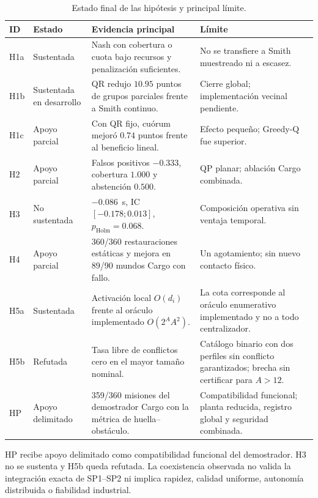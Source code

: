 \begin{table}[H]
  \centering
  \caption{Estado final de las hipótesis y principal límite.}
  \label{tab:conclusion-hypotheses}
  \small
  \setlength{\tabcolsep}{3pt}
  \begin{tabularx}{\textwidth}{@{}p{0.8cm}p{1.75cm}p{5.1cm}X@{}}
    \toprule
    ID & Estado & Evidencia principal & Límite \\
    \midrule
    H1a & Sustentada & Nash con cobertura o cuota bajo recursos y penalización suficientes. & No se transfiere a Smith muestreado ni a escasez. \\
    H1b & Sustentada en desarrollo & QR redujo $10.95$ puntos de grupos parciales frente a Smith continuo. & Cierre global; implementación vecinal pendiente. \\
    H1c & Apoyo parcial & Con QR fijo, cuórum mejoró $0.74$ puntos frente al beneficio lineal. & Efecto pequeño; Greedy-Q fue superior. \\
    H2 & Apoyo parcial & Falsos positivos $-0.333$, cobertura $1.000$ y abstención $0.500$. & QP planar; ablación Cargo combinada. \\
    H3 & No sustentada & $-0.086$~s, IC $[-0.178;0.013]$, $p_{\mathrm{Holm}}=0.068$. & Composición operativa sin ventaja temporal. \\
    H4 & Apoyo parcial & 360/360 restauraciones estáticas y mejora en 89/90 mundos Cargo con fallo. & Un agotamiento; sin nuevo contacto físico. \\
    H5a & Sustentada & Activación local $O(d_i)$ frente al oráculo implementado $O(2^A A^2)$. & La cota corresponde al oráculo enumerativo implementado y no a todo centralizador. \\
    H5b & Refutada & Tasa libre de conflictos cero en el mayor tamaño nominal. & Catálogo binario con dos perfiles sin conflicto garantizados; brecha sin certificar para $A>12$. \\
    HP & Apoyo delimitado & 359/360 misiones del demostrador Cargo con la métrica de huella--obstáculo. & Compatibilidad funcional; planta reducida, registro global y seguridad combinada. \\
    \bottomrule
  \end{tabularx}
  \viuownsource
\end{table}

HP recibe apoyo delimitado como compatibilidad funcional del demostrador. H3 no
se sustenta y H5b queda refutada. La coexistencia observada no valida la
integración exacta de SP1--SP2 ni implica rapidez, calidad uniforme, autonomía
distribuida o fiabilidad industrial.


